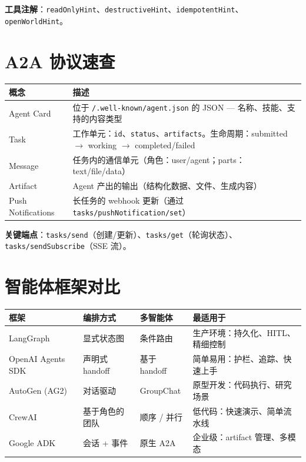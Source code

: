 \textbf{工具注解}：\texttt{readOnlyHint}、\texttt{destructiveHint}、\texttt{idempotentHint}、\texttt{openWorldHint}。

\section{A2A 协议速查}
\label{a2a-protocol-quick-reference}

\noindent\begin{tabularx}{\linewidth}{@{}l Z{1}@{}}
\toprule
\textbf{概念} & \textbf{描述} \\
\midrule
Agent Card & 位于 \texttt{/.well-known/agent.json} 的 JSON --- 名称、技能、支持的内容类型 \\
Task & 工作单元：\texttt{id}、\texttt{status}、\texttt{artifacts}。生命周期：submitted $\to$ working $\to$ completed/failed \\
Message & 任务内的通信单元（角色：user/agent；parts：text/file/data） \\
Artifact & Agent 产出的输出（结构化数据、文件、生成内容） \\
Push Notifications & 长任务的 webhook 更新（通过 \texttt{tasks/pushNotification/set}） \\
\bottomrule
\end{tabularx}

\textbf{关键端点}：\texttt{tasks/send}（创建/更新）、\texttt{tasks/get}（轮询状态）、\texttt{tasks/sendSubscribe}（SSE 流）。

\section{智能体框架对比}
\label{agent-framework-comparison}

\noindent\begin{tabularx}{\linewidth}{@{}l Z{0.8} Z{0.5} Z{1.7}@{}}
\toprule
\textbf{框架} & \textbf{编排方式} & \textbf{多智能体} & \textbf{最适用于} \\
\midrule
LangGraph & 显式状态图 & 条件路由 & 生产环境：持久化、HITL、精细控制 \\
OpenAI Agents SDK & 声明式 handoff & 基于 handoff & 简单易用：护栏、追踪、快速上手 \\
AutoGen (AG2) & 对话驱动 & GroupChat & 原型开发：代码执行、研究场景 \\
CrewAI & 基于角色的团队 & 顺序 / 并行 & 低代码：快速演示、简单流水线 \\
Google ADK & 会话 + 事件 & 原生 A2A & 企业级：artifact 管理、多模态 \\
\bottomrule
\end{tabularx}

